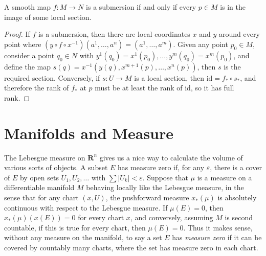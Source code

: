 \begin{theorem}
    A smooth map $f: M \to N$ is a submersion if and only if every $p \in M$ is in the image of some local section.
\end{theorem}
\begin{proof}
    If $f$ is a submersion, then there are local coordinates $x$ and $y$ around every point where $(y \circ f \circ x^{-1})(a^1, \dots, a^n) = (a^1, \dots, a^m)$. Given any point $p_0 \in M$, consider a point $q_0 \in N$ with $y^1(q_0) = x^1(p_0), \dots, y^m(q_0) = x^m(p_0)$, and define the map $s(q) = x^{-1}(y(q), x^{m+1}(p), \dots, x^n(p))$, then $s$ is the required section. Conversely, if $s: U \to M$ is a local section, then $\text{id} = f_* \circ s_*$, and therefore the rank of $f_*$ at $p$ must be at least the rank of $\text{id}$, so it has full rank.
\end{proof}

\section{Manifolds and Measure}

The Lebesgue measure on $\mathbf{R}^n$ gives us a nice way to calculate the volume of various sorts of objects. A subset $E$ has measure zero if, for any $\varepsilon$, there is a cover of $E$ by open sets $U_1, U_2, \dots$ with $\sum |U_k| < \varepsilon$. Suppose that $\mu$ is a measure on a differentiable manifold $M$ behaving locally like the Lebesgue measure, in the sense that for any chart $(x,U)$, the pushforward measure $x_*(\mu)$ is absolutely continuous with respect to the Lebesgue measure. If $\mu(E) = 0$, then $x_*(\mu)(x(E)) = 0$ for every chart $x$, and conversely, assuming $M$ is second countable, if this is true for every chart, then $\mu(E) = 0$. Thus it makes sense, without any measure on the manifold, to say a set $E$ has \emph{measure zero} if it can be covered by countably many charts, where the set has measure zero in each chart.

